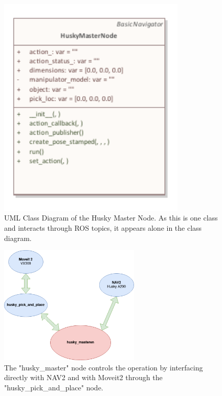 \begin{figure}[htp]
  \centering
  \includegraphics[width = 0.8\textwidth]{Figures/husky_master.pdf}
  \caption{UML Class Diagram of the Husky Master Node. As this is one class and interacts through ROS topics, it appears alone in the class diagram.}
  \label{fig:huskyMasterUML}
\end{figure}

\begin{figure}[htp]
  \centering
  \includegraphics[width = 0.6\textwidth]{Figures/software_overview.drawio.png}
  \caption{The "husky\_master" node controls the operation by interfacing directly with NAV2 and with Moveit2 through the "husky\_pick\_and\_place" node.}
  \label{fig:husky_master}
\end{figure}
